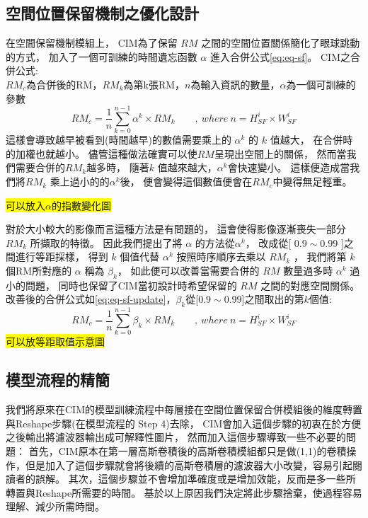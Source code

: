 \documentclass[class=NCU_thesis, crop=false]{standalone}
\begin{document}
	\subsection{空間位置保留機制之優化設計}
	在空間保留機制模組上，
	CIM為了保留 $RM$ 之間的空間位置關係簡化了眼球跳動的方式，
	加入了一個可訓練的時間遺忘函數 $\alpha$ 進入合併公式\cref{eq:eq-sf}。
	CIM之合併公式:\\
		$RM_{c}$為合併後的RM，$RM_{k}$為第k張RM，$n$為輸入資訊的數量，$\alpha$為一個可訓練的參數
		\begin{equation}
		    \label{eq:eq-sf}
		    RM_{c}=\frac{1}{n} \sum_{k = 0}^{n-1} \alpha^{k} \times RM_{k}  \qquad ,\ where\ n = \textit{H}^{i}_{SF} \times \textit{W}^{i}_{SF}
		\end{equation}
	這樣會導致越早被看到(時間越早)的數值需要乘上的 $\alpha^{k}$ 的 $k$ 值越大，
	在合併時的加權也就越小。
	儘管這種做法確實可以使$RM$呈現出空間上的關係，
	然而當我們需要合併的$RM_{k}$越多時，
	隨著$k$ 值越來越大，$\alpha^{k}$會快速變小。
	這樣便造成當我們將$RM_{k}$ 乘上過小的的$\alpha^{k}$後，
	便會變得這個數值便會在$RM_{c}$中變得無足輕重。
	
	\colorbox {yellow}{可以放入$\alpha$的指數變化圖}

	對於大小較大的影像而言這種方法是有問題的，
	這會使得影像逐漸喪失一部分$ RM_{k} $ 所擷取的特徵。
	因此我們提出了將 $\alpha$ 的方法從$\alpha^{k}$，
	改成從[ $0.9 \sim 0.99$ ]之間進行等距採樣，
	得到 $k$ 個值代替 $\alpha^{k}$ 按照時序順序去乘以 $RM_{k}$ ，
	我們將第 $k$ 個RM所對應的 $\alpha$ 稱為 $\beta_{k}$，
	如此便可以改善當需要合併的 $RM$ 數量過多時 $\alpha^{k}$ 過小的問題，
	同時也保留了CIM當初設計時希望保留的 $RM$ 之間的對應空間關係。\\
	改善後的合併公式如\cref{eq:eq-sf-update}，$\beta_{k}$從[$0.9 \sim 0.99$]之間取出的第$k$個值:\\
		\begin{equation}
		    \label{eq:eq-sf-update}
		    RM_{c}=\frac{1}{n} \sum_{k = 0}^{n-1} \beta_{k} \times RM_{k}  \qquad ,\ where\ n = \textit{H}^{i}_{SF} \times \textit{W}^{i}_{SF}
		\end{equation}
	\colorbox {yellow}{可以放等距取值示意圖\cite{YangCNNInterpretable}}

	\subsection{模型流程的精簡}

	我們將原來在CIM的模型訓練流程中每層接在空間位置保留合併模組後的維度轉置與Reshape步驟(在\cite{YangCNNInterpretable}模型流程的 Step 4)去除，
	CIM會加入這個步驟的初衷在於方便之後輸出將濾波器輸出成可解釋性圖片，
	然而加入這個步驟導致一些不必要的問題：
	首先，CIM原本在第一層高斯卷積後的高斯卷積模組都只是做(1,1)的卷積操作，但是加入了這個步驟就會將後續的高斯卷積層的濾波器大小改變，容易引起閱讀者的誤解。
	其次，這個步驟並不會增加準確度或是增加效能，反而是多一些所轉置與Reshape所需要的時間。
	基於以上原因我們決定將此步驟捨棄，使過程容易理解、減少所需時間。
\end{document}
